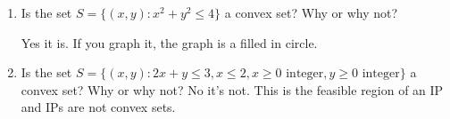 \documentclass[11pt]{article}
\theoremstyle{definition}
\newcommand{\blu}{\color{blue}}
\begin{document}
\begin{enumerate}
\item Is the set $S = \{(x,y): x^2 + y^2 \leq 4\}$ a convex set? Why or why not?

{\blu
Yes it is. If you graph it, the graph is a filled in circle.
}

\item Is the set $S = \{(x,y): 2x + y \leq 3, x \leq 2, x\geq 0 \text{ integer}, y \geq 0 \text{ integer}\}$ a convex set? Why or why not?
{\blu
No it's not. This is the feasible region of an IP and IPs are not convex sets.
}

\end{enumerate}
\end{document}
